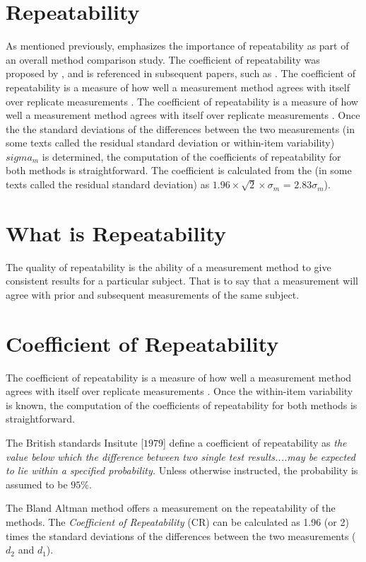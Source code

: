 \documentclass[12pt, a4paper]{report}
\theoremstyle{plain}
\theoremstyle{definition}
\theoremstyle{remark}
\begin{document}
	\section{Repeatability}
	As mentioned previously, \citet{Barnhart} emphasizes the importance of repeatability as part of an overall method comparison study. The coefficient of repeatability was proposed by \citet{BA99}, and is referenced in subsequent papers, such as \citet{BXC2008}. The coefficient of repeatability is a measure of how well a
	measurement method agrees with itself over replicate measurements
	\citep{BA99}. The coefficient of repeatability is a measure of how well a
	measurement method agrees with itself over replicate measurements
	\citep{BA99}. Once the the standard deviations of the differences between the two measurements (in some texts called the residual standard deviation or within-item variability) $sigma_m$ is determined, the
	computation of the coefficients of repeatability for both methods
	is straightforward. The coefficient is calculated from the (in some texts called the residual standard deviation) as  $1.96 \times \sqrt{2} \times \sigma_m$ = $2.83 \sigma_m$).
	
	\section{What is Repeatability}
	The quality of repeatability is the ability of a measurement method to give consistent results for a particular subject. That is to say that a measurement will agree with prior and subsequent measurements of the same subject.


	\section{Coefficient of Repeatability}
	The coefficient of repeatability is a measure of how well a
	measurement method agrees with itself over replicate measurements
	\citep{BA99}. Once the within-item variability is known, the
	computation of the coefficients of repeatability for both methods
	is straightforward.
	
	The British standards Insitute [$1979$] define a coefficient of
	repeatability  as \emph{the value below which the difference between two single test results....may be expected to lie within a specified probability.} Unless otherwise instructed, the
	probability is assumed to be $95\%$. 
	
	The Bland Altman method offers a measurement on the repeatability of the methods. The \emph{Coefficient of Repeatability} (CR) can be calculated as 1.96 (or 2) times the standard deviations of the differences between the two measurements ($d_2$ and $d_1$).
	
\end{document}
